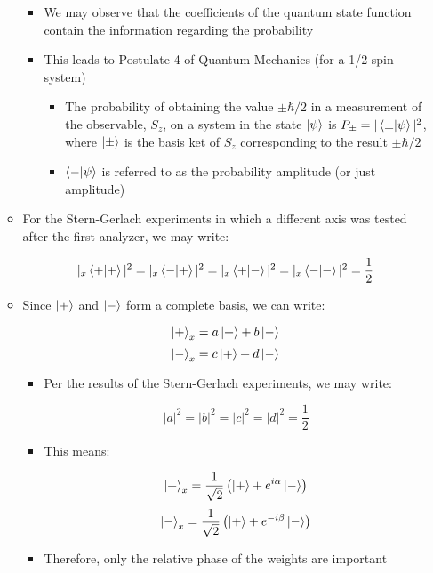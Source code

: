 \begin{itemize}
\begin{itemize}
\begin{itemize}
          \item We may observe that the coefficients of the quantum state function contain the information regarding the probability

          \item This leads to Postulate 4 of Quantum Mechanics (for a 1/2-spin system)

            \begin{itemize}

              \item The probability of obtaining the value $\pm\hbar/2$ in a measurement of the observable, $S_z$, on a system in the state $\ket{\psi}$ is $P_{\pm}=|\bra{\pm}\ket{\psi}|^2$, where $\ket{\pm}$ is the basis ket of $S_z$ corresponding to the result $\pm\hbar/2$

              \item $\bra{-}\ket{\psi}$ is referred to as the probability amplitude (or just amplitude)

            \end{itemize}

        \end{itemize}

      \item For the Stern-Gerlach experiments in which a different axis was tested after the first analyzer, we may write:

        $$|_x\bra{+}\ket{+}|^2=|_x\bra{-}\ket{+}|^2=|_x\bra{+}\ket{-}|^2=|_x\bra{-}\ket{-}|^2=\frac{1}{2}$$

      \item Since $\ket{+}$ and $\ket{-}$ form a complete basis, we can write:

        $$\ket{+}_x=a\ket{+}+b\ket{-}$$
        $$\ket{-}_x=c\ket{+}+d\ket{-}$$

        \begin{itemize}

          \item Per the results of the Stern-Gerlach experiments, we may write:

            $$|a|^2=|b|^2=|c|^2=|d|^2=\frac{1}{2}$$

          \item This means:

            $$\ket{+}_x=\frac{1}{\sqrt{2}}\left( \ket{+}+e^{i\alpha}\ket{-} \right)$$
            $$\ket{-}_x=\frac{1}{\sqrt{2}}\left( \ket{+}+e^{-i\beta}\ket{-} \right)$$

          \item Therefore, only the relative phase of the weights are important


\end{itemize}
\end{itemize}
\end{itemize}
